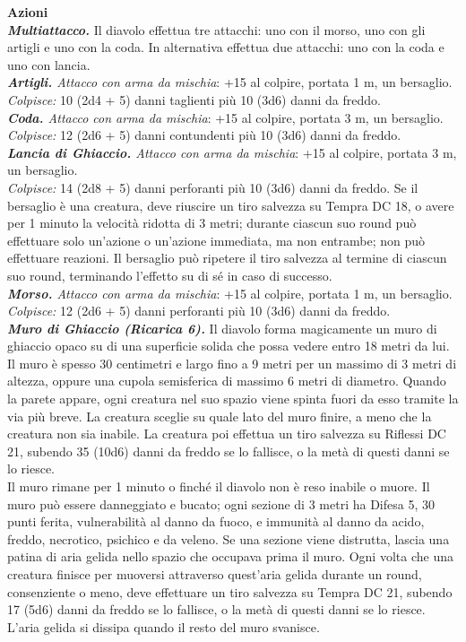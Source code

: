 \begin{multicols}{2}
\smallskip\textbf{Azioni}\\
\emph{\textbf{Multiattacco.}} Il diavolo effettua tre attacchi: uno con
il morso, uno con gli artigli e uno con la coda. In alternativa effettua due attacchi: uno con la coda e uno con lancia.\\
\emph{\textbf{Artigli.} Attacco con arma da mischia}: +15 al colpire, portata 1 m, un bersaglio.\\
\emph{Colpisce:} 10 (2d4 + 5) danni taglienti più 10 (3d6) danni da freddo.\\
\emph{\textbf{Coda.} Attacco con arma da mischia}: +15 al colpire, portata 3 m, un bersaglio.\\
\emph{Colpisce:} 12 (2d6 + 5) danni contundenti più 10 (3d6) danni da freddo.\\
\emph{\textbf{Lancia di Ghiaccio.} Attacco con arma da mischia}: +15 al colpire, portata 3 m, un bersaglio.\\
\emph{Colpisce:} 14 (2d8 + 5) danni perforanti più 10 (3d6) danni da freddo. Se il bersaglio è una creatura, deve riuscire un tiro salvezza su Tempra DC  18, o avere per 1 minuto la velocità ridotta di 3 metri; durante ciascun suo round può effettuare solo un'azione o un'azione immediata, ma non entrambe; non può effettuare reazioni. Il bersaglio può ripetere il tiro salvezza al termine di ciascun suo round, terminando l'effetto su di sé in caso di successo.\\
\emph{\textbf{Morso.} Attacco con arma da mischia}: +15 al colpire, portata 1 m, un bersaglio.\\
\emph{Colpisce:} 12 (2d6 + 5) danni perforanti più 10 (3d6) danni da freddo.\\
\emph{\textbf{Muro di Ghiaccio (Ricarica 6).}} Il diavolo forma magicamente un muro di ghiaccio opaco su di una superficie solida che possa vedere entro 18 metri da lui. Il muro è spesso 30 centimetri e largo fino a 9 metri per un massimo di 3 metri di altezza, oppure una cupola semisferica di massimo 6 metri di diametro. Quando la parete appare, ogni creatura nel suo spazio viene spinta fuori da esso tramite la via più breve. La creatura sceglie su quale lato del muro finire, a meno che la creatura non sia inabile. La creatura poi effettua un tiro salvezza su Riflessi DC  21, subendo 35 (10d6) danni da freddo se lo fallisce, o la metà di questi danni se lo riesce.\\
Il muro rimane per 1 minuto o finché il diavolo non è reso inabile o muore. Il muro può essere danneggiato e bucato; ogni sezione di 3 metri ha Difesa 5, 30 punti ferita, vulnerabilità al danno da fuoco, e immunità al danno da acido, freddo, necrotico, psichico e da veleno. Se una sezione viene distrutta, lascia una patina di aria gelida nello spazio che occupava prima il muro. Ogni volta che una creatura finisce per muoversi attraverso quest'aria gelida durante un round, consenziente o meno, deve effettuare un tiro salvezza su Tempra DC  21, subendo 17 (5d6) danni da freddo se lo fallisce, o la metà di questi danni se lo riesce. \\
L'aria gelida si dissipa quando il resto del muro svanisce.\\



\end{multicols}
